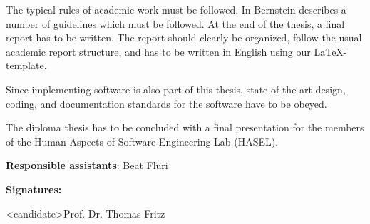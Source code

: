 \documentclass{hasel_task}
\begin{document}
The typical rules of academic work must be followed. In
\cite{Bernstein2005-daguide} Bernstein describes a number of guidelines which
must be followed. At the end of the thesis, a final report has to be
written. The report should clearly be organized, follow the usual academic
report structure, and has to be written in English using our \LaTeX-template.

Since implementing software is also part of this thesis, state-of-the-art
design, coding, and documentation standards for the software have to be obeyed.

The diploma thesis has to be concluded with a final presentation for the members
of the Human Aspects of Software Engineering Lab (HASEL).

\vspace{2em}
\noindent\textbf{Responsible assistants}: Beat Fluri

\vspace{2em}
\noindent\textbf{Signatures:}

\vspace{3\baselineskip}
\noindent <candidate>\hfill Prof. Dr. Thomas Fritz
\clearpage


\end{document}
